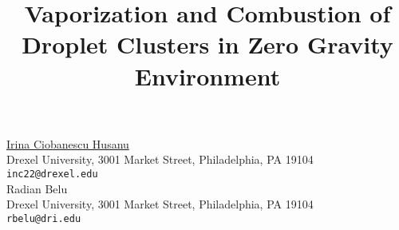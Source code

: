 


\title{Vaporization and Combustion of Droplet Clusters in Zero Gravity Environment }
\author{} \institute{} %
\maketitle
\begin{center}
{\large \underline{Irina Ciobanescu Husanu}}\\
Drexel University, 3001 Market Street, Philadelphia, PA 19104\\
{\tt inc22@drexel.edu}\\
\vspace{4mm} %
{\large Radian Belu}\\
Drexel University, 3001 Market Street, Philadelphia, PA 19104\\
{\tt rbelu@dri.edu}
\end{center}

